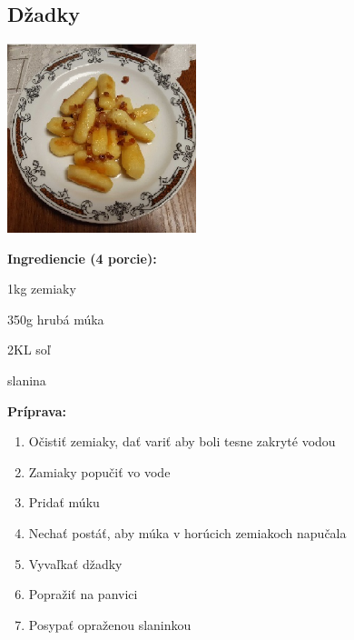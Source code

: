 \setcounter{step}{0}

\subsection{ Džadky }

\begin{ingredient}
  
      \includegraphics[height=5.5cm]{images/dzadky}
  
  \def\portions{  }
  \textbf{ {\normalsize Ingrediencie (4 porcie):} }

  \begin{main}
      \item 1kg zemiaky
      \item 350g hrubá múka
      \item 2KL soľ
      \item slanina
  \end{main}
  
\end{ingredient}
\begin{recipe}
\textbf{ {\normalsize Príprava:} }
\begin{enumerate}

  \item{Očistiť zemiaky, dať variť aby boli tesne zakryté vodou}
  \item{Zamiaky popučiť vo vode}
  \item{Pridať múku}
  \item{Nechať postáť, aby múka v horúcich zemiakoch napučala}
  \item{Vyvaľkať džadky}
  \item{Popražiť na panvici}
  \item{Posypať opraženou slaninkou}

\end{enumerate}
\end{recipe}

\begin{notes}
  
\end{notes}	
\clearpage
